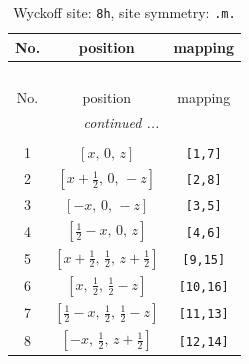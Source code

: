 \documentclass[fleqn,8pt]{jsarticle}
\begin{document}
\begin{longtable}{ccc}
\caption{Wyckoff site: {\tt 8h}, site symmetry: {\tt .m.}}
 \\
 \hline \hline
No. & position & mapping \\ \hline \endfirsthead

\multicolumn{2}{l}{\tablename\ \thetable{}} \\
 \hline \hline
No. & position & mapping \\ \hline \endhead

 \hline \hline
\multicolumn{2}{r}{\footnotesize\it continued ...} \\ \endfoot

 \hline \hline
\multicolumn{2}{r}{} \\ \endlastfoot

1 & $\left[ x,\, 0,\, z \right]$ & {\tt [1,7]} \\ \hline
2 & $\left[ x + \frac{1}{2},\, 0,\, - z \right]$ & {\tt [2,8]} \\ \hline
3 & $\left[ - x,\, 0,\, - z \right]$ & {\tt [3,5]} \\ \hline
4 & $\left[ \frac{1}{2} - x,\, 0,\, z \right]$ & {\tt [4,6]} \\ \hline
5 & $\left[ x + \frac{1}{2},\, \frac{1}{2},\, z + \frac{1}{2} \right]$ & {\tt [9,15]} \\ \hline
6 & $\left[ x,\, \frac{1}{2},\, \frac{1}{2} - z \right]$ & {\tt [10,16]} \\ \hline
7 & $\left[ \frac{1}{2} - x,\, \frac{1}{2},\, \frac{1}{2} - z \right]$ & {\tt [11,13]} \\ \hline
8 & $\left[ - x,\, \frac{1}{2},\, z + \frac{1}{2} \right]$ & {\tt [12,14]} \\
\end{longtable}
\renewcommand{\arraystretch}{1.2}
\end{document}
